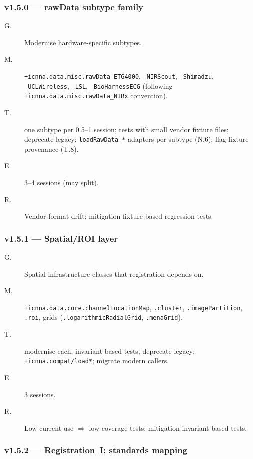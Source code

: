 \documentclass[11pt,a4paper]{article}
\begin{document}
\subsubsection*{v1.5.0 --- rawData subtype family}

\begin{description}
    \item[G.] Modernise hardware-specific subtypes.
    \item[M.] \texttt{+icnna.data.misc.rawData\_ETG4000}, \texttt{\_NIRScout}, \texttt{\_Shimadzu}, \texttt{\_UCLWireless}, \texttt{\_LSL}, \texttt{\_BioHarnessECG} (following \texttt{+icnna.data.misc.rawData\_NIRx} convention).
    \item[T.] one subtype per 0.5--1 session; tests with small vendor fixture files; deprecate legacy; \texttt{loadRawData\_*} adapters per subtype (N.6); flag fixture provenance (T.8).
    \item[E.] 3--4 sessions (may split).
    \item[R.] Vendor-format drift; mitigation fixture-based regression tests.
\end{description}

\subsubsection*{v1.5.1 --- Spatial/ROI layer}

\begin{description}
    \item[G.] Spatial-infrastructure classes that registration depends on.
    \item[M.] \texttt{+icnna.data.core.channelLocationMap}, \texttt{.cluster}, \texttt{.imagePartition}, \texttt{.roi}, grids (\texttt{.logarithmicRadialGrid}, \texttt{.menaGrid}).
    \item[T.] modernise each; invariant-based tests; deprecate legacy; \texttt{+icnna.compat/load*}; migrate modern callers.
    \item[E.] 3 sessions.
    \item[R.] Low current use $\Rightarrow$ low-coverage tests; mitigation invariant-based tests.
\end{description}

\subsubsection*{v1.5.2 --- Registration~I: standards mapping}
\end{document}
